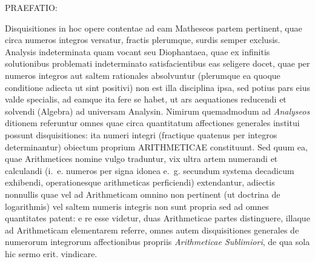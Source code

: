 \begin{center}
{\Large\textsc{PRAEFATIO:}}

\medskip

\end{center}

\noindent Disquisitiones in hoc opere contentae ad eam Matheseos partem pertinent, quae circa numeros integros versatur, fractis plerumque, surdis semper exclusis. Analysis indeterminata quam vocant seu Diophantaea, quae ex infinitis solutionibus problemati indeterminato satisfacientibus eas seligere docet, quae per numeros integros aut saltem rationales absolvuntur (plerumque ea quoque conditione adiecta ut sint positivi) non est illa disciplina ipsa, sed potius pars eius valde specialis, ad eamque ita fere se habet, ut ars aequationes reducendi et solvendi (Algebra) ad universam Analysin. Nimirum quemadmodum ad \emph{Analyseos} ditionem referuntur omnes quae circa quantitatum affectiones generales institui possunt disquisitiones: ita numeri integri (fractique quatenus per integros determinantur) obiectum proprium \textsc{ARITHMETICAE} constituunt. Sed quum ea, quae Arithmetices nomine vulgo traduntur, vix ultra artem numerandi et calculandi (i.~e. numeros per signa idonea e.~g. secundum systema decadicum exhibendi, operationesque arithmeticas perficiendi) extendantur, adiectis nonnullis quae vel ad Arithmeticam omnino non pertinent (ut doctrina de logarithmis) vel saltem numeris integris non sunt propria sed ad omnes quantitates patent: e re esse videtur, duas Arithmeticae partes distinguere, illaque ad Arithmeticam elementarem referre, omnes autem disquisitiones generales de numerorum integrorum affectionibus propriis \emph{Arithmeticae Sublimiori}, de qua sola hic sermo erit. vindicare.

